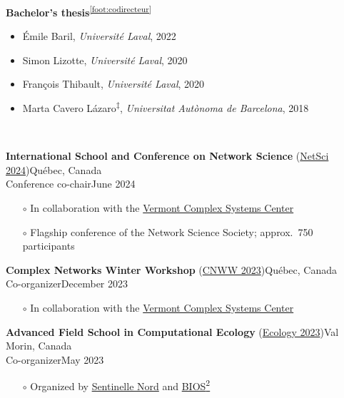 \documentclass[11pt]{article}
\newcommand{\TitreSection}[1]{\colorbox{background}{\makebox[\textwidth-0.5em][c]{\Large\textrm{\textsc{#1}}}}\vspace{0.75\baselineskip}\\}
\begin{document}
%
%
%
\textbf{Bachelor's thesis}\textsuperscript{\ref{foot:codirecteur}}
%
\begin{itemize}
  \item Émile Baril, \textit{Universit\'e Laval}, 2022
  \item Simon Lizotte, \textit{Universit\'e Laval}, 2020
  \item Fran\c{c}ois Thibault, \textit{Universit\'e Laval}, 2020
  \item Marta Cavero L\'azaro\textsuperscript{$\ddagger$}, \textit{Universitat Aut\`onoma de Barcelona}, 2018
\end{itemize} \vspace{0.75\baselineskip}
%
%
%
%
%
\pagebreak
\TitreSection{Organizing Activities}
%
\parbox{\textwidth}{%
\textbf{International School and Conference on Network Science} (\href{https://netscisociety.net/events/netsci}{NetSci 2024})\hfill Qu\'ebec, Canada\\
Conference co-chair\hfill June 2024
\begin{itemize}[leftmargin=1.5em]\small
  \item[$\circ$] In collaboration with the \href{https://vermontcomplexsystems.org/}{Vermont Complex Systems Center}
  \item[$\circ$] Flagship conference of the Network Science Society; approx.~750 participants
\end{itemize}}
%
\parbox{\textwidth}{%
\textbf{Complex Networks Winter Workshop} (\href{https://vermontcomplexsystems.org/events/cnww/}{CNWW 2023})\hfill Qu\'ebec, Canada\\
Co-organizer\hfill December 2023
\begin{itemize}[leftmargin=1.5em]\small
  \item[$\circ$] In collaboration with the \href{https://vermontcomplexsystems.org/}{Vermont Complex Systems Center}
\end{itemize}}
%
\parbox{\textwidth}{%
\textbf{Advanced Field School in Computational Ecology} (\href{https://sentinellenord.ulaval.ca/en/ecology2023}{Ecology 2023})\hfill Val Morin, Canada\\
Co-organizer\hfill May 2023
\begin{itemize}[leftmargin=1.5em]\small
  \item[$\circ$] Organized by \href{http://sentinellenord.ulaval.ca/}{Sentinelle Nord} and \href{https://bios2.usherbrooke.ca/}{BIOS\textsuperscript{2}}
\end{itemize}}
\end{document}
